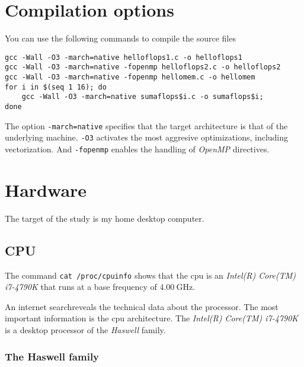 \documentclass[
    12pt, %
]{fphw}
\newcommand{\tech}{\texttt}
\begin{document}
\section*{Compilation options}

You can use the following commands to compile the source files

\begin{lstlisting}
gcc -Wall -O3 -march=native helloflops1.c -o helloflops1
gcc -Wall -O3 -march=native -fopenmp helloflops2.c -o helloflops2
gcc -Wall -O3 -march=native -fopenmp hellomem.c -o hellomem
for i in $(seq 1 16); do
    gcc -Wall -O3 -march=native sumaflops$i.c -o sumaflops$i;
done
\end{lstlisting}

\noindent
The option \tech{-march=native} specifies that the target architecture is
that of the underlying machine.
\tech{-O3} activates the most aggresive optimizations, including vectorization.
And \tech{-fopenmp} enables the handling of \textit{OpenMP} directives.




\section{Hardware}

    The target of the study is my home desktop computer.

\subsection{CPU}

    The command \tech{cat /proc/cpuinfo} shows that the cpu is an
\textit{Intel(R) Core(TM) i7-4790K}
that runs at a base frequency of $\SI{4.00}{\GHz}$.

\noindent
An internet search\footnotemark reveals the technical data about the processor.
The most important information is the cpu architecture.
The \textit{Intel(R) Core(TM) i7-4790K} is a desktop processor of the
\textit{Haswell} family.


\subsubsection{The Haswell family}
\end{document}

